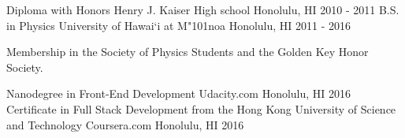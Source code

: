 \begin{cventries}
	\cventry
	{Diploma with Honors}
	{Henry J. Kaiser High school}
	{Honolulu, HI}
	{2010 - 2011}
	{}
	\cventry
	{B.S. in Physics}
	{University of Hawai`i at M{\char"101}noa}
	{Honolulu, HI}
	{2011 - 2016}
	{
	  \begin{cvitems}
	    \item {Membership in the Society of Physics Students and the Golden Key Honor Society.}
	  \end{cvitems}
	}
	\cventry
	{Nanodegree in Front-End Development}
	{Udacity.com}
	{Honolulu, HI}
	{2016}
	{}  
	\cventry
	{Certificate in Full Stack Development from the Hong Kong University of Science and Technology}
	{Coursera.com}
	{Honolulu, HI}
	{2016}
	{}  
\end{cventries}
